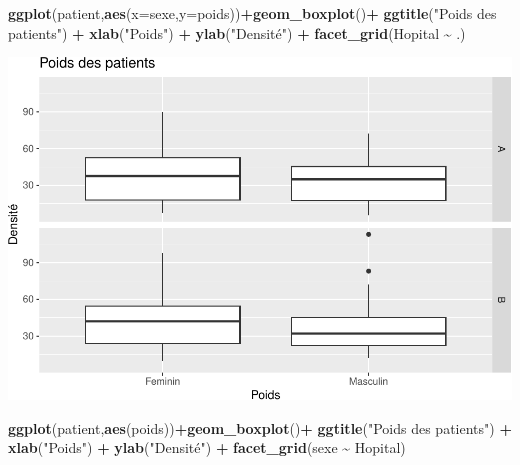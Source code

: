 \documentclass[
]{book}
\newenvironment{Shaded}{\begin{snugshade}}{\end{snugshade}}
\newcommand{\AttributeTok}[1]{\textcolor[rgb]{0.13,0.29,0.53}{#1}}
\newcommand{\FunctionTok}[1]{\textcolor[rgb]{0.13,0.29,0.53}{\textbf{#1}}}
\newcommand{\NormalTok}[1]{#1}
\newcommand{\SpecialCharTok}[1]{\textcolor[rgb]{0.81,0.36,0.00}{\textbf{#1}}}
\newcommand{\StringTok}[1]{\textcolor[rgb]{0.31,0.60,0.02}{#1}}
\begin{document}
\begin{Shaded}
\begin{Highlighting}[]
\FunctionTok{ggplot}\NormalTok{(patient,}\FunctionTok{aes}\NormalTok{(}\AttributeTok{x=}\NormalTok{sexe,}\AttributeTok{y=}\NormalTok{poids))}\SpecialCharTok{+}\FunctionTok{geom\_boxplot}\NormalTok{()}\SpecialCharTok{+}
  \FunctionTok{ggtitle}\NormalTok{(}\StringTok{"Poids des patients"}\NormalTok{) }\SpecialCharTok{+} 
  \FunctionTok{xlab}\NormalTok{(}\StringTok{"Poids"}\NormalTok{) }\SpecialCharTok{+} 
  \FunctionTok{ylab}\NormalTok{(}\StringTok{"Densité"}\NormalTok{) }\SpecialCharTok{+}
  \FunctionTok{facet\_grid}\NormalTok{(Hopital }\SpecialCharTok{\textasciitilde{}}\NormalTok{ .)}
\end{Highlighting}
\end{Shaded}

\includegraphics{_main_files/figure-latex/ggplot13-1.pdf}

\begin{Shaded}
\begin{Highlighting}[]
\FunctionTok{ggplot}\NormalTok{(patient,}\FunctionTok{aes}\NormalTok{(poids))}\SpecialCharTok{+}\FunctionTok{geom\_boxplot}\NormalTok{()}\SpecialCharTok{+}
  \FunctionTok{ggtitle}\NormalTok{(}\StringTok{"Poids des patients"}\NormalTok{) }\SpecialCharTok{+} 
  \FunctionTok{xlab}\NormalTok{(}\StringTok{"Poids"}\NormalTok{) }\SpecialCharTok{+} 
  \FunctionTok{ylab}\NormalTok{(}\StringTok{"Densité"}\NormalTok{) }\SpecialCharTok{+}
  \FunctionTok{facet\_grid}\NormalTok{(sexe }\SpecialCharTok{\textasciitilde{}}\NormalTok{ Hopital)}
\end{Highlighting}
\end{Shaded}
\end{document}
